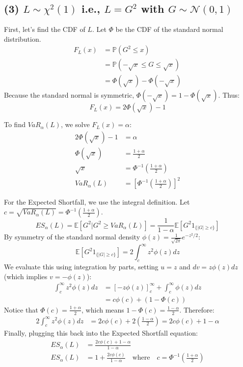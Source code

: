 \subsection*{(3) $L \sim \chi^2(1)$ i.e., $L=G^2$ with $G \sim \mathcal{N}(0,1)$}

First, let's find the CDF of $L$. Let $\Phi$ be the CDF of the standard normal distribution.
\begin{align*}
F_L(x) &= \mathbb{P}(G^2 \le x) \\
&= \mathbb{P}(-\sqrt{x} \le G \le \sqrt{x}) \\
&= \Phi(\sqrt{x}) - \Phi(-\sqrt{x}) 
\end{align*}
Because the standard normal is symmetric, $\Phi(-\sqrt{x}) = 1 - \Phi(\sqrt{x})$. Thus:
\begin{equation*}
F_L(x) = 2\Phi(\sqrt{x}) - 1
\end{equation*}

To find $VaR_{\alpha}(L)$, we solve $F_L(x) = \alpha$:
\begin{align*}
2\Phi(\sqrt{x}) - 1 &= \alpha \\
\Phi(\sqrt{x}) &= \frac{1+\alpha}{2} \\
\sqrt{x} &= \Phi^{-1}\left(\frac{1+\alpha}{2}\right) \\
VaR_{\alpha}(L) &= \left[ \Phi^{-1}\left(\frac{1+\alpha}{2}\right) \right]^2
\end{align*}

For the Expected Shortfall, we use the integral definition. Let $c = \sqrt{VaR_{\alpha}(L)} = \Phi^{-1}\left(\frac{1+\alpha}{2}\right)$. 
\begin{equation*}
ES_{\alpha}(L) = \mathbb{E}[G^2 | G^2 \ge VaR_{\alpha}(L)] = \frac{1}{1-\alpha}\mathbb{E}[G^2 1_{\{|G| \ge c\}}]
\end{equation*}
By symmetry of the standard normal density $\phi(z) = \frac{1}{\sqrt{2\pi}}e^{-z^2/2}$:
\begin{equation*}
\mathbb{E}[G^2 1_{\{|G| \ge c\}}] = 2 \int_c^\infty z^2 \phi(z) dz
\end{equation*}
We evaluate this using integration by parts, setting $u=z$ and $dv = z\phi(z)dz$ (which implies $v = -\phi(z)$):
\begin{align*}
\int_c^\infty z^2 \phi(z) dz &= \left[ -z\phi(z) \right]_c^\infty + \int_c^\infty \phi(z) dz \\
&= c\phi(c) + (1 - \Phi(c))
\end{align*}
Notice that $\Phi(c) = \frac{1+\alpha}{2}$, which means $1 - \Phi(c) = \frac{1-\alpha}{2}$. Therefore:
\begin{align*}
2 \int_c^\infty z^2 \phi(z) dz &= 2c\phi(c) + 2\left(\frac{1-\alpha}{2}\right) = 2c\phi(c) + 1 - \alpha
\end{align*}
Finally, plugging this back into the Expected Shortfall equation:
\begin{align*}
ES_{\alpha}(L) &= \frac{2c\phi(c) + 1 - \alpha}{1-\alpha} \\
ES_{\alpha}(L) &= 1 + \frac{2c\phi(c)}{1-\alpha} \quad \text{where} \quad c = \Phi^{-1}\left(\frac{1+\alpha}{2}\right)
\end{align*}


